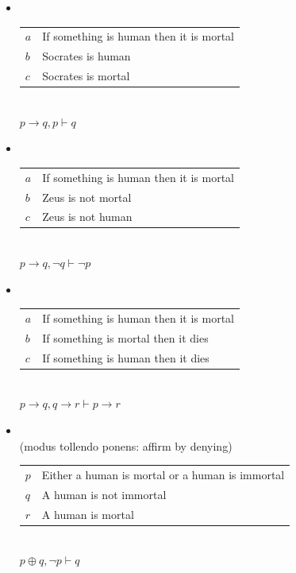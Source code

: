 \documentclass[a4paper,landscape,headrule,footrule,xetex]{foils}
\begin{document}
\begin{itemize}
\item {}
\\[2ex]
  \begin{tabular}{ll}
    $a$ & If something is human then it is mortal \\
    $b$ & Socrates is human \\ \hline
    $c$ & Socrates is mortal
  \end{tabular}
\\ $p \rightarrow q, p \vdash q$
\item {}
\\[2ex]
  \begin{tabular}{ll}
    $a$ & If something is human then it is mortal \\
    $b$ & Zeus is not mortal \\ \hline
    $c$ & Zeus is not human
  \end{tabular}
\\ $p \rightarrow q, \neg q \vdash \neg p$

\newpage
\item {}
\\[2ex]
 \begin{tabular}{ll}
    $a$ & If something is human then it is mortal \\
    $b$ & If something is mortal then it dies \\ \hline
    $c$ & If something is human then it dies
  \end{tabular}
\\ $p \rightarrow q, q \rightarrow r \vdash p \rightarrow r$
\item {}
\\ (modus tollendo ponens: affirm by denying)
\\[2ex]
 \begin{tabular}{ll}
    $p$ & Either a human is mortal or a human is immortal \\
    $q$ & A human is not immortal \\ \hline
    $r$ & A human is mortal
  \end{tabular}
\\ $p \oplus q, \neg p \vdash q$
\end{itemize}
\end{document}
